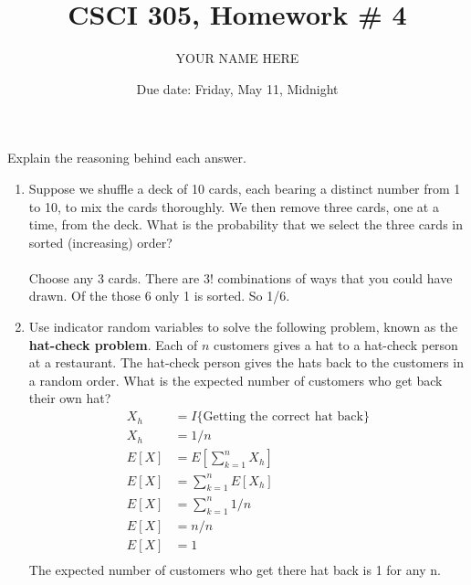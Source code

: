 \documentclass{article}
\title{CSCI 305, Homework \# 4}
\author{YOUR NAME HERE}
\date{Due date:  Friday, May 11, Midnight}
\begin{document}
    
    \maketitle
    
    Explain the reasoning behind each answer.
    
    \begin{enumerate}
    
    \item
      Suppose we shuffle a deck of 10 cards, each bearing a distinct
      number from 1 to 10, to mix the cards thoroughly.  We then remove
      three cards, one at a time, from the deck.  What is the probability
      that we select the three cards in sorted (increasing) order?
      \\
      \\
      Choose any 3 cards. There are 3! combinations of ways that you could have drawn. Of the those 6 only 1 is sorted. So 1/6.
    
    \item
      Use indicator random variables to solve the following problem,
      known as the {\bf hat-check problem}.
      Each of $n$ customers gives a hat to a hat-check person at a
      restaurant.  The hat-check person gives the hats back to the customers
      in a random order.  What is the expected number of customers who get
      back their own hat?
      \\
      
      
      \begin{align*}
      X_h &= I\{\mbox{Getting the correct hat back\}}\\
      X_h &= 1/n \\
      E[X] &= E\left[\sum_{k = 1}^n X_h\right] \\
      E[X] &= \sum_{k = 1}^n E[X_h] \\
      E[X] &= \sum_{k = 1}^n 1/n \\
      E[X] &= n/n \\
      E[X] &= 1 \\
      \end{align*}
      The expected number of customers who get there hat back is 1 for any n.      

      
    \end{enumerate}
    
    
\end{document}

